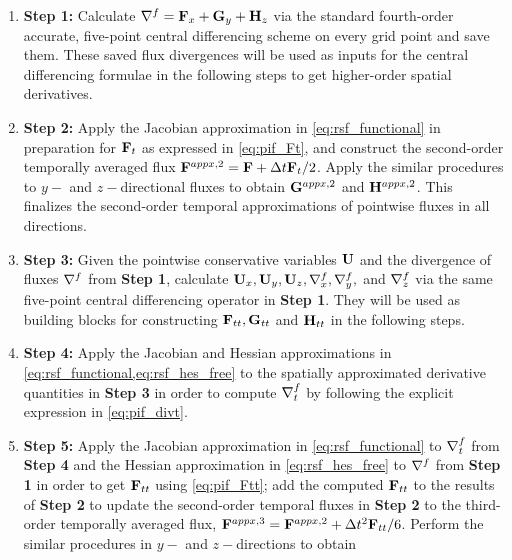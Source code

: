 \begin{enumerate}
    \item[] \textbf{Step 1:}
        Calculate \( \nabla^{f} = \mathbf{F}_{x} + \mathbf{G}_{y} + \mathbf{H}_{z} \) via the standard fourth-order accurate, 
        five-point central differencing scheme
        on every grid point and save them.
        These saved flux divergences will be used as inputs for the central differencing formulae
        in the following steps to get higher-order spatial derivatives.
    \item[] \textbf{Step 2:}
        Apply the Jacobian approximation in \cref{eq:rsf_functional} in preparation 
        for \( \mathbf{F}_{t} \) as expressed in \cref{eq:pif_Ft},
        and construct the second-order temporally averaged flux \( \mathbf{F}^{appx,2} = \mathbf{F} + \Delta t \mathbf{F}_{t}/2 \).
        Apply the similar procedures to \( y- \) and \( z- \)directional fluxes to obtain
        \( \mathbf{G}^{appx,2}\) and \( \mathbf{H}^{appx,2}\).
        This finalizes the second-order temporal approximations of pointwise fluxes in all directions.
    \item[] \textbf{Step 3:}
        Given the pointwise conservative variables \( \mathbf{U} \) and
        the divergence of fluxes \( \nabla^{f} \) from \textbf{Step 1},
        calculate \( \mathbf{U}_{x}, \mathbf{U}_{y}, \mathbf{U}_{z}, \nabla^{f}_{x}, \nabla^{f}_{y}, \) and \( \nabla^{f}_{z} \)
        via the same five-point central differencing operator in \textbf{Step 1}.
        They will be used as building blocks for constructing \( \mathbf{F}_{tt}, \mathbf{G}_{tt} \) and \( \mathbf{H}_{tt} \)
        in the following steps.
    \item[] \textbf{Step 4:}
        Apply the Jacobian and Hessian approximations in \cref{eq:rsf_functional,eq:rsf_hes_free} to
        the spatially approximated derivative quantities in \textbf{Step 3}
        in order to compute \( \nabla^{f}_{t} \)
        by following the explicit expression in \cref{eq:pif_divt}.
    \item[] \textbf{Step 5:}
        Apply the Jacobian approximation in \eqref{eq:rsf_functional}
        to \( \nabla^{f}_{t} \) from \textbf{Step 4} and
        the Hessian approximation in \eqref{eq:rsf_hes_free}
        to \( \nabla^{f}\) from  \textbf{Step 1} in order
        to get \( \mathbf{F}_{tt} \) using \cref{eq:pif_Ftt};
        add the computed \( \mathbf{F}_{tt} \)  to the results of \textbf{Step 2}
        to update the second-order temporal fluxes in \textbf{Step 2} 
        to the third-order temporally averaged flux,
        \( \mathbf{F}^{appx,3} = \mathbf{F}^{appx,2} + \Delta t^{2} \mathbf{F}_{tt}/6 \).
        Perform the similar procedures in \( y- \) and \( z- \)directions to obtain

\end{enumerate}
